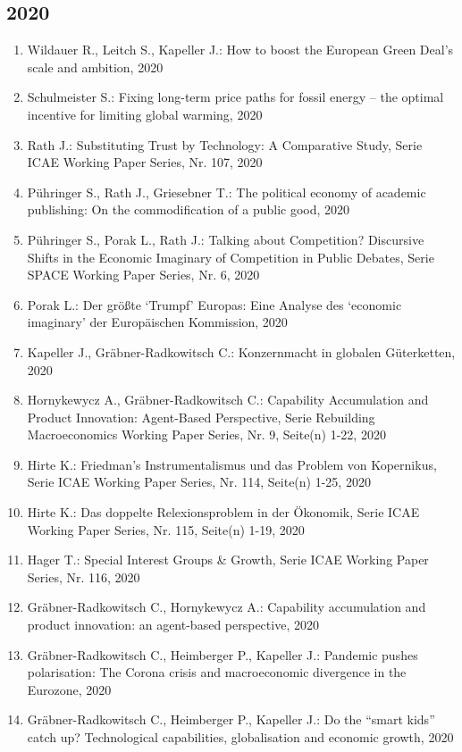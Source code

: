 \subsection*{2020}
\begin{enumerate}
    	 \item Wildauer R., Leitch S., Kapeller J.: How to boost the European Green Deal’s scale and ambition, 2020
	 \item Schulmeister S.: Fixing long-term price paths for fossil energy – the optimal incentive for limiting global warming, 2020
	 \item Rath J.: Substituting Trust by Technology: A Comparative Study, Serie ICAE Working Paper Series, Nr. 107, 2020
	 \item Pühringer S., Rath J., Griesebner T.: The political economy of academic publishing: On the commodification of a public good, 2020
	 \item Pühringer S., Porak L., Rath J.: Talking about Competition? Discursive Shifts in the Economic Imaginary of Competition in Public Debates, Serie SPACE Working Paper Series, Nr. 6, 2020
	 \item Porak L.: Der größte ‘Trumpf’ Europas: Eine Analyse des ‘economic imaginary’ der Europäischen Kommission, 2020
	 \item Kapeller J., Gräbner-Radkowitsch C.: Konzernmacht in globalen Güterketten, 2020
	 \item Hornykewycz A., Gräbner-Radkowitsch C.: Capability Accumulation and Product Innovation: Agent-Based Perspective, Serie Rebuilding Macroeconomics Working Paper Series, Nr. 9, Seite(n) 1-22, 2020
	 \item Hirte K.: Friedman’s Instrumentalismus und das Problem von Kopernikus, Serie ICAE Working Paper Series, Nr. 114, Seite(n) 1-25, 2020
	 \item Hirte K.: Das doppelte Relexionsproblem in der Ökonomik, Serie ICAE Working Paper Series, Nr. 115, Seite(n) 1-19, 2020
	 \item Hager T.: Special Interest Groups & Growth, Serie ICAE Working Paper Series, Nr. 116, 2020
	 \item Gräbner-Radkowitsch C., Hornykewycz A.: Capability accumulation and product innovation: an agent-based perspective, 2020
	 \item Gräbner-Radkowitsch C., Heimberger P., Kapeller J.: Pandemic pushes polarisation: The Corona crisis and macroeconomic divergence in the Eurozone, 2020
	 \item Gräbner-Radkowitsch C., Heimberger P., Kapeller J.: Do the “smart kids” catch up? Technological capabilities, globalisation and economic growth, 2020

\end{enumerate}
